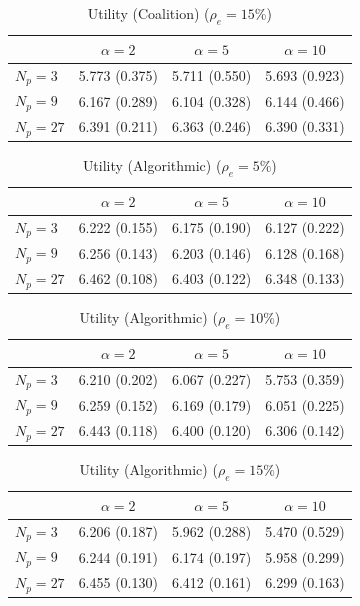 \begin{table}[htbp]
\centering
\begin{tabular}{lccc}
\toprule
 & $\alpha=2$ & $\alpha=5$ & $\alpha=10$ \\
\midrule
$N_p=3$ & 5.773 (0.375) & 5.711 (0.550) & 5.693 (0.923) \\
$N_p=9$ & 6.167 (0.289) & 6.104 (0.328) & 6.144 (0.466) \\
$N_p=27$ & 6.391 (0.211) & 6.363 (0.246) & 6.390 (0.331) \\
\bottomrule
\end{tabular}
\caption{Utility (Coalition) ($\rho_e=15\%$)}
\label{tab:exp2_avg_utility_gov_coalition_rho15}
\end{table}


\begin{table}[htbp]
\centering
\begin{tabular}{lccc}
\toprule
 & $\alpha=2$ & $\alpha=5$ & $\alpha=10$ \\
\midrule
$N_p=3$ & 6.222 (0.155) & 6.175 (0.190) & 6.127 (0.222) \\
$N_p=9$ & 6.256 (0.143) & 6.203 (0.146) & 6.128 (0.168) \\
$N_p=27$ & 6.462 (0.108) & 6.403 (0.122) & 6.348 (0.133) \\
\bottomrule
\end{tabular}
\caption{Utility (Algorithmic) ($\rho_e=5\%$)}
\label{tab:exp2_avg_utility_gov_algorithmic_rho5}
\end{table}


\begin{table}[htbp]
\centering
\begin{tabular}{lccc}
\toprule
 & $\alpha=2$ & $\alpha=5$ & $\alpha=10$ \\
\midrule
$N_p=3$ & 6.210 (0.202) & 6.067 (0.227) & 5.753 (0.359) \\
$N_p=9$ & 6.259 (0.152) & 6.169 (0.179) & 6.051 (0.225) \\
$N_p=27$ & 6.443 (0.118) & 6.400 (0.120) & 6.306 (0.142) \\
\bottomrule
\end{tabular}
\caption{Utility (Algorithmic) ($\rho_e=10\%$)}
\label{tab:exp2_avg_utility_gov_algorithmic_rho10}
\end{table}


\begin{table}[htbp]
\centering
\begin{tabular}{lccc}
\toprule
 & $\alpha=2$ & $\alpha=5$ & $\alpha=10$ \\
\midrule
$N_p=3$ & 6.206 (0.187) & 5.962 (0.288) & 5.470 (0.529) \\
$N_p=9$ & 6.244 (0.191) & 6.174 (0.197) & 5.958 (0.299) \\
$N_p=27$ & 6.455 (0.130) & 6.412 (0.161) & 6.299 (0.163) \\
\bottomrule
\end{tabular}
\caption{Utility (Algorithmic) ($\rho_e=15\%$)}
\label{tab:exp2_avg_utility_gov_algorithmic_rho15}
\end{table}


